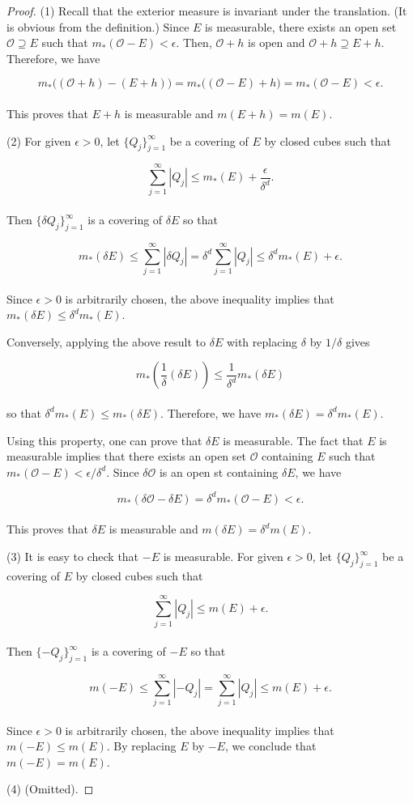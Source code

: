 \documentclass[12pt, a4paper, openany, twoside]{book}
\theoremstyle{definition}
\theoremstyle{remark}
\theoremstyle{plain}
\numberwithin{equation}{section}
\begin{document}
\begin{proof}
    (1) Recall that the exterior measure is invariant under the translation. (It is obvious from the definition.) Since $E$ is measurable, there exists an open set $\mathcal{O}\supseteq E$ such that $m_*(\mathcal{O}-E)<\epsilon$. Then, $\mathcal{O}+h$ is open and $\mathcal{O}+h\supseteq E+h$. Therefore, we have 

    \[m_*\big((\mathcal{O}+h)-(E+h)\big)=m_*\big((\mathcal{O}-E)+h\big)=m_*(\mathcal{O}-E)<\epsilon.\]
    \\
    This proves that $E+h$ is measurable and $m(E+h)=m(E)$.

    \vspace{5mm}
    (2) For given $\epsilon>0$, let $\{Q_j\}_{j=1}^{\infty}$ be a covering of $E$ by closed cubes such that 

    \[\sum_{j=1}^{\infty}{|Q_j|}\leq m_*(E)+\frac{\epsilon}{\delta^d}.\]
    \\
    Then $\{\delta Q_j\}_{j=1}^{\infty}$ is a covering of $\delta E$ so that 

    \[m_*(\delta E)\leq \sum_{j=1}^{\infty}{|\delta Q_j|}=\delta^d\sum_{j=1}^{\infty}{|Q_j|}\leq \delta^d m_*(E)+\epsilon.\]
    \\
    Since $\epsilon>0$ is arbitrarily chosen, the above inequality implies that $m_*(\delta E)\leq \delta^d m_*(E)$. 

    Conversely, applying the above result to $\delta E$ with replacing $\delta$ by $1/\delta$ gives 

    \[m_*\left(\frac{1}{\delta}(\delta E)\right)\leq\frac{1}{\delta^d}m_*(\delta E)\]
    \\
    so that $\delta^d m_*(E)\leq m_*(\delta E)$. Therefore, we have $m_*(\delta E)=\delta^d m_*(E)$.

    Using this property, one can prove that $\delta E$ is measurable. The fact that $E$ is measurable implies that there exists an open set $\mathcal{O}$ containing $E$ such that $m_*(\mathcal{O}-E)<\epsilon/\delta^d$. Since $\delta \mathcal{O}$ is an open st containing $\delta E$, we have 

    \[m_*(\delta\mathcal{O}-\delta E)=\delta^d m_*(\mathcal{O}-E)<\epsilon.\]
    \\
    This proves that $\delta E$ is measurable and $m(\delta E)=\delta^d m(E)$.

    \vspace{5mm}
    (3) It is easy to check that $-E$ is measurable. For given $\epsilon>0$, let $\{Q_j\}_{j=1}^\infty$ be a covering of $E$ by closed cubes such that 

    \[\sum_{j=1}^{\infty}{|Q_j|}\leq m(E)+\epsilon.\]
    \\
    Then $\{-Q_j\}_{j=1}^{\infty}$ is a covering of $-E$ so that 

    \[m(-E)\leq\sum_{j=1}^{\infty}{|-Q_j|}=\sum_{j=1}^{\infty}{|Q_j|}\leq m(E)+\epsilon.\]
    \\
    Since $\epsilon>0$ is arbitrarily chosen, the above inequality implies that $m(-E)\leq m(E)$. By replacing $E$ by $-E$, we conclude that $m(-E)=m(E)$.

    \vspace{5mm}
    (4) (Omitted).
\end{proof}
\end{document}
